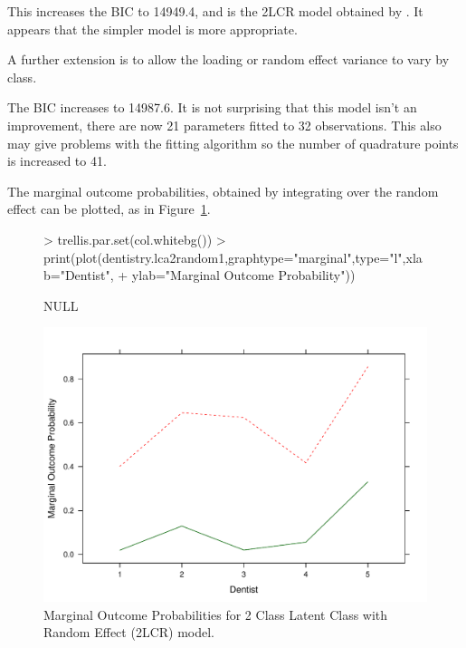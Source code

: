 This increases the BIC to 14949.4, and is the 2LCR model obtained by \citet{qu:1996}. It appears that the simpler model is more appropriate.

A further extension is to allow the loading or random effect variance to vary by class.

\begin{Schunk}
\end{Schunk}

The BIC increases to 14987.6. It is not surprising that this model isn't an improvement, there are now 21 parameters fitted to 32 observations. This also may give problems with the fitting algorithm so the number of quadrature points is increased to 41.

The marginal outcome probabilities, obtained by integrating over the random effect can be plotted, as in Figure~\ref{fig:outcome2}.



\begin{figure}
  \centering
\begin{Schunk}
\begin{Sinput}
> trellis.par.set(col.whitebg())
> print(plot(dentistry.lca2random1,graphtype="marginal",type="l",xlab="Dentist",
+     ylab="Marginal Outcome Probability"))
\end{Sinput}
\begin{Soutput}
NULL
\end{Soutput}
\end{Schunk}
\includegraphics{randomLCA-example-026}
  \caption{Marginal Outcome Probabilities for 2 Class Latent Class with Random Effect (2LCR) model.}
  \label{fig:outcome2}
\end{figure}

